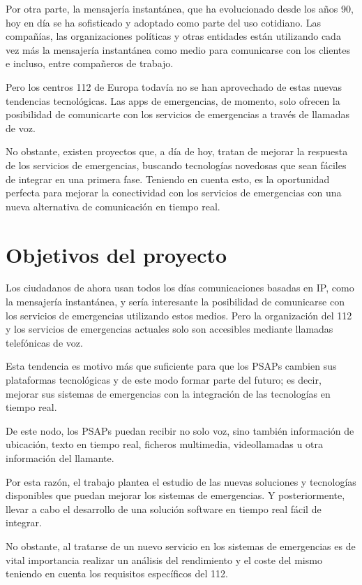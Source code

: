 Por otra parte, la mensajería instantánea, que ha evolucionado desde los años 90, hoy en día se ha sofisticado y adoptado como parte del uso cotidiano. Las compañías, las organizaciones políticas y otras entidades están utilizando cada vez más la mensajería instantánea como medio para comunicarse con los clientes e incluso, entre compañeros de trabajo.

Pero los centros 112 de Europa todavía no se han aprovechado de estas nuevas tendencias tecnológicas. Las apps de emergencias, de momento, solo ofrecen la posibilidad de comunicarte con los servicios de emergencias a través de llamadas de voz.

No obstante, existen proyectos que, a día de hoy, tratan de mejorar la respuesta de los servicios de emergencias, buscando tecnologías novedosas que sean fáciles de integrar en una primera fase. Teniendo en cuenta esto, es la oportunidad perfecta para mejorar la conectividad con los servicios de emergencias con una nueva alternativa de comunicación en tiempo real.

\section{Objetivos del proyecto}

Los ciudadanos de ahora usan todos los días comunicaciones basadas en IP, como la mensajería instantánea, y sería interesante la posibilidad de comunicarse con los servicios de emergencias utilizando estos medios. Pero la organización del 112 y los servicios de emergencias actuales solo son accesibles mediante llamadas telefónicas de voz.

Esta tendencia es motivo más que suficiente para que los PSAPs cambien sus plataformas tecnológicas y de este modo formar parte del futuro; es decir, mejorar sus sistemas de emergencias con la integración de las tecnologías en tiempo real.

De este nodo, los PSAPs puedan recibir no solo voz, sino también información de ubicación, texto en tiempo real, ficheros multimedia, videollamadas u otra información del llamante.

Por esta razón, el trabajo plantea el estudio de las nuevas soluciones y tecnologías disponibles que puedan mejorar los sistemas de emergencias. Y posteriormente, llevar a cabo el desarrollo de una solución software en tiempo real fácil de integrar.

No obstante, al tratarse de un nuevo servicio en los sistemas de emergencias es de vital importancia realizar un análisis del rendimiento y el coste del mismo teniendo en cuenta los requisitos específicos del 112.
